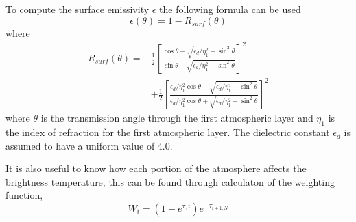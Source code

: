 To compute the surface emissivity $\epsilon$ the following formula can be used
\begin{equation}\label{eq:rtm-esurf}
\epsilon(\theta) = 1-R_{surf}(\theta)
\end{equation}
where
\begin{equation}\label{eq:rtm-rsurf}
\begin{split}
R_{surf}(\theta) =& \frac{1}{2} \left[ \frac{\cos\theta - \sqrt{\epsilon_d/\eta_1^2-\sin^2\theta}}{\sin\theta + \sqrt{\epsilon_d/\eta_1^2-\sin^2\theta}} \right]^2\\
&+\frac{1}{2} \left[ \frac{\epsilon_d/\eta_1^2 \cos\theta - \sqrt{\epsilon_d/\eta_1^2-\sin^2\theta}}{\epsilon_d/\eta_1^2 \cos\theta + \sqrt{\epsilon_d/\eta_1^2-\sin^2\theta}} \right]^2
\end{split}
\end{equation}
where $\theta$ is the transmission angle through the first atmospheric layer and $\eta_1$ is the index of refraction for the first atmospheric layer. The dielectric constant $\epsilon_d$ is assumed to have a uniform value of $4.0$.

It is also useful to know how each portion of the atmosphere affects the brightness temperature, this can be found through calculaton of the weighting function,
\begin{equation}
W_i = (1-e^{\tau,i}) e^{-\tau_{i+1,N}}
\end{equation}











